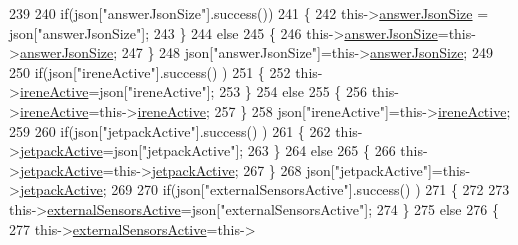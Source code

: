 \begin{DoxyCode}
239 
240             \textcolor{keywordflow}{if}(json[\textcolor{stringliteral}{"answerJsonSize"}].success())
241             \{
242                 this->\hyperlink{classCoolBoard_af2da1f85315b3d074a8b87d158094fb7}{answerJsonSize} = json[\textcolor{stringliteral}{"answerJsonSize"}];
243             \}
244             \textcolor{keywordflow}{else}
245             \{
246                 this->\hyperlink{classCoolBoard_af2da1f85315b3d074a8b87d158094fb7}{answerJsonSize}=this->\hyperlink{classCoolBoard_af2da1f85315b3d074a8b87d158094fb7}{answerJsonSize};
247             \}
248             json[\textcolor{stringliteral}{"answerJsonSize"}]=this->\hyperlink{classCoolBoard_af2da1f85315b3d074a8b87d158094fb7}{answerJsonSize};
249             
250             \textcolor{keywordflow}{if}(json[\textcolor{stringliteral}{"ireneActive"}].success() )
251             \{
252                 this->\hyperlink{classCoolBoard_a1de9b5516695b2e1668bf2e3a6701332}{ireneActive}=json[\textcolor{stringliteral}{"ireneActive"}];
253             \}
254             \textcolor{keywordflow}{else}
255             \{
256                 this->\hyperlink{classCoolBoard_a1de9b5516695b2e1668bf2e3a6701332}{ireneActive}=this->\hyperlink{classCoolBoard_a1de9b5516695b2e1668bf2e3a6701332}{ireneActive};
257             \}
258             json[\textcolor{stringliteral}{"ireneActive"}]=this->\hyperlink{classCoolBoard_a1de9b5516695b2e1668bf2e3a6701332}{ireneActive};   
259 
260             \textcolor{keywordflow}{if}(json[\textcolor{stringliteral}{"jetpackActive"}].success() )
261             \{       
262                 this->\hyperlink{classCoolBoard_a4dc6ff276ed178975bd8b459fa7421dc}{jetpackActive}=json[\textcolor{stringliteral}{"jetpackActive"}];
263             \}
264             \textcolor{keywordflow}{else}
265             \{
266                 this->\hyperlink{classCoolBoard_a4dc6ff276ed178975bd8b459fa7421dc}{jetpackActive}=this->\hyperlink{classCoolBoard_a4dc6ff276ed178975bd8b459fa7421dc}{jetpackActive};
267             \}
268             json[\textcolor{stringliteral}{"jetpackActive"}]=this->\hyperlink{classCoolBoard_a4dc6ff276ed178975bd8b459fa7421dc}{jetpackActive};
269             
270             \textcolor{keywordflow}{if}(json[\textcolor{stringliteral}{"externalSensorsActive"}].success() )
271             \{           
272             
273                 this->\hyperlink{classCoolBoard_af29860cc422622dc33614f9eabb58c40}{externalSensorsActive}=json[\textcolor{stringliteral}{"externalSensorsActive"}];
274             \}
275             \textcolor{keywordflow}{else}
276             \{
277                 this->\hyperlink{classCoolBoard_af29860cc422622dc33614f9eabb58c40}{externalSensorsActive}=this->

\end{DoxyCode}
